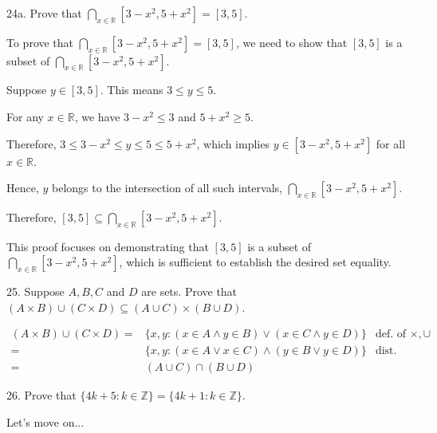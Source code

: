 \documentclass{idrisMemo}
\newcommand{\set}[1]{\{#1\}}
\begin{document}
\begin{prooflist}{24a. Prove that $\bigcap_{x \in \mathbb{R}}\left[3-x^2, 5+x^2\right]=[3,5]$.}
\item
To prove that $\bigcap_{x \in \mathbb{R}}\left[3-x^2, 5+x^2\right]=[3,5]$, we need to show that $[3,5]$ is a subset of $\bigcap_{x \in \mathbb{R}}\left[3-x^2, 5+x^2\right]$.

\item Suppose $y \in [3,5]$. This means $3 \leq y \leq 5$.

\item For any $x \in \mathbb{R}$, we have $3 - x^2 \leq 3$ and $5 + x^2 \geq 5$.

\item Therefore, $3 \leq 3 - x^2 \leq y \leq 5 \leq 5 + x^2$, which implies $y \in \left[3-x^2, 5+x^2\right]$ for all $x \in \mathbb{R}$.

\item Hence, $y$ belongs to the intersection of all such intervals, $\bigcap_{x \in \mathbb{R}}\left[3-x^2, 5+x^2\right]$.

\item Therefore, $[3,5] \subseteq \bigcap_{x \in \mathbb{R}}\left[3-x^2, 5+x^2\right]$.

\end{prooflist}

This proof focuses on demonstrating that $[3,5]$ is a subset of $\bigcap_{x \in \mathbb{R}}\left[3-x^2, 5+x^2\right]$, which is sufficient to establish the desired set equality.

\begin{prooflist}{25. Suppose $A, B, C$ and $D$ are sets. Prove that $(A \times
    B) \cup(C \times D) \subseteq(A \cup C) \times(B \cup D)$.} \item
\begin{align*}
    (A\times B)\cup (C\times D)=& \set{x, y: (x\in A \land y\in B) \lor (x\in C
    \land y\in D) } & \text{def. of }\times,\cup\\
    =& \set{x,y: (x\in A \lor x\in C) \land (y\in B \lor y\in D) } & \text{dist.
    property}\\
    =& (A\cup C) \cap (B\cup D)
\end{align*}
\end{prooflist}

\begin{prooflist}{26. Prove that $\{4 k+5: k \in \mathbb{Z}\}=\{4 k+1: k \in \mathbb{Z}\}$.}
\item
    Let's move on...
\end{prooflist}
\end{document}
